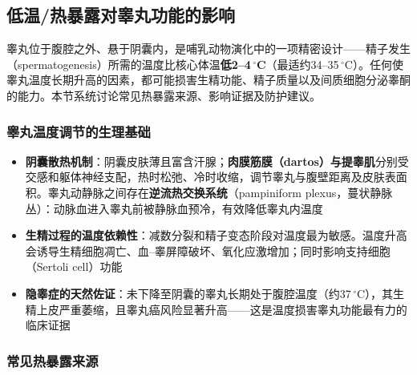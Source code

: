 \subsection{低温/热暴露对睾丸功能的影响}
\label{subsec:testicular_temperature}

睾丸位于腹腔之外、悬于阴囊内，是哺乳动物演化中的一项精密设计——精子发生（spermatogenesis）所需的温度比核心体温\textbf{低2--4\,$^\circ$C}（最适约34--35\,$^\circ$C）。任何使睾丸温度长期升高的因素，都可能损害生精功能、精子质量以及间质细胞分泌睾酮的能力。本节系统讨论常见热暴露来源、影响证据及防护建议。

\subsubsection{睾丸温度调节的生理基础}

\begin{itemize}[leftmargin=2cm]
	\item \textbf{阴囊散热机制}：阴囊皮肤薄且富含汗腺；\textbf{肉膜筋膜（dartos）与提睾肌}分别受交感和躯体神经支配，热时松弛、冷时收缩，调节睾丸与腹壁距离及皮肤表面积。睾丸动静脉之间存在\textbf{逆流热交换系统}（pampiniform plexus，蔓状静脉丛）：动脉血进入睾丸前被静脉血预冷，有效降低睾丸内温度
	\item \textbf{生精过程的温度依赖性}：减数分裂和精子变态阶段对温度最为敏感。温度升高会诱导生精细胞凋亡、血--睾屏障破坏、氧化应激增加；同时影响支持细胞（Sertoli cell）功能
	\item \textbf{隐睾症的天然佐证}：未下降至阴囊的睾丸长期处于腹腔温度（约37\,$^\circ$C），其生精上皮严重萎缩，且睾丸癌风险显著升高——这是温度损害睾丸功能最有力的临床证据
\end{itemize}

\subsubsection{常见热暴露来源}

